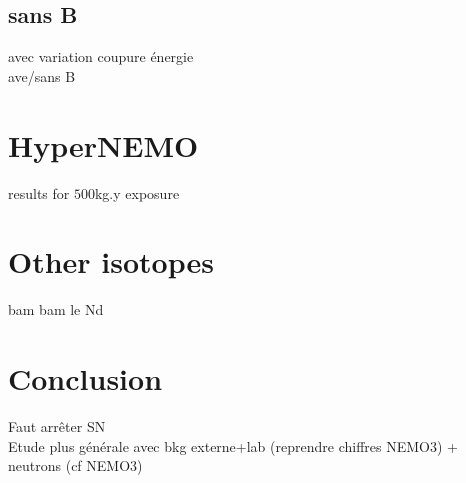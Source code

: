 \subsection{sans B}
avec variation coupure énergie\\
ave/sans B

\section{HyperNEMO}
results for $500$kg.y exposure

\section{Other isotopes}
bam bam le Nd

\section{Conclusion}
Faut arrêter SN\\
Etude plus générale avec bkg externe+lab (reprendre chiffres NEMO3)
+ neutrons (cf NEMO3)
